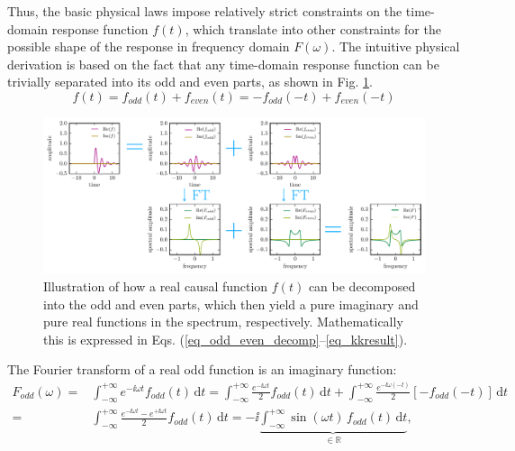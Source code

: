 Thus, the basic physical laws impose relatively strict constraints on the time-domain response function $f(t)$, which translate into other constraints for the possible shape of the response in frequency domain $F(\omega)$. The intuitive physical derivation is based on the fact that any time-domain response function can be trivially separated into its odd and even parts, as shown in Fig. \ref{fg_kk}. 
\begin{equation}f(t) = f_{odd}(t) + f_{even}(t) = -f_{odd}(-t) + f_{even}(-t) \label{eq_odd_even_decomp}\end{equation}
\begin{figure}[t] \caption{Illustration of how a real causal function $f(t)$ can be decomposed into the odd and even parts, which then yield a pure imaginary and pure real functions in the spectrum, respectively. Mathematically this is expressed in Eqs. (\ref{eq_odd_even_decomp}--\ref{eq_kkresult}).} \label{fg_kk} \centering 
	\includegraphics[width=17.5cm]{img/Kramers_Kronig_plot/kk.pdf}
\end{figure}
The Fourier transform of a real odd function is an imaginary function:
\begin{equation} 
\begin{split} 
F_{odd}(\omega)=& \int_{-\infty}^{+\infty} e^{-\ii \omega t} f_{odd}(t) \,\mbox{d}t = 
		 \int_{-\infty}^{+\infty} \frac{e^{-\ii \omega   t }}{2} f_{odd}(t) \,\mbox{d}t 
		   +  \int_{-\infty}^{+\infty} \frac{e^{-\ii \omega (-t)}}{2} [-f_{odd}(-t)] \,\mbox{d}t  \\
		 =&   \int_{-\infty}^{+\infty} \frac{e^{-\ii \omega t}-e^{+\ii \omega t}}{2} f_{odd}(t) \,\mbox{d}t 
		 = -\ii \underbrace{\int_{-\infty}^{+\infty} \sin(\omega t) \, f_{odd}(t) \,\mbox{d}t}_{\mbox{$\in \mathbb{R}$}},
\end{split} 
\label{eq_kkF}\end{equation}
